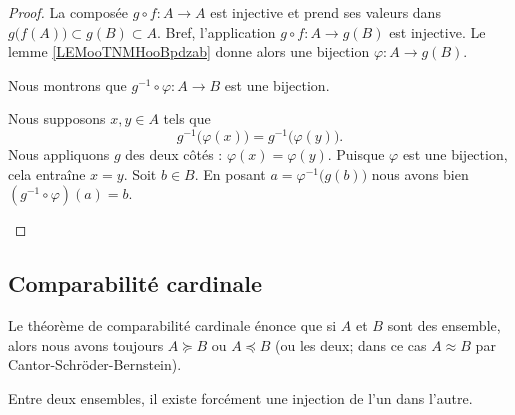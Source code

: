 \begin{proof}
	La composée \( g\circ f\colon A\to A\) est injective et prend ses valeurs dans \( g\big( f(A) \big)\subset g(B)\subset A\). Bref, l'application \( g\circ f\colon A \to g(B)\) est injective. Le lemme \ref{LEMooTNMHooBpdzab} donne alors une bijection \( \varphi\colon A\to g(B)\).

	Nous montrons que \( g^{-1}\circ\varphi\colon A\to B\) est une bijection.

	\begin{subproof}
		\spitem[Injective]
		Nous supposons \( x,y\in A\) tels que
		\begin{equation}
			g^{-1}\big( \varphi(x) \big)=g^{-1}\big( \varphi(y) \big).
		\end{equation}
		Nous appliquons \( g\) des deux côtés : \( \varphi(x)=\varphi(y)\). Puisque \( \varphi\) est une bijection, cela entraîne \( x=y\).
		\spitem[Surjective]
		Soit \( b\in B\). En posant \( a=\varphi^{-1}\big( g(b) \big)\) nous avons bien \( (g^{-1}\circ \varphi)(a)=b\).
	\end{subproof}
\end{proof}

\subsection{Comparabilité cardinale}

Le théorème de comparabilité cardinale énonce que si \( A\) et \( B\) sont des ensemble, alors nous avons toujours \( A\succeq B\) ou \( A\preceq B\) (ou les deux; dans ce cas \( A\approx B\) par Cantor-Schröder-Bernstein).
\begin{theorem}     \label{THOooCBSKooCmzfUf}
	Entre deux ensembles, il existe forcément une injection de l'un dans l'autre.
\end{theorem}

